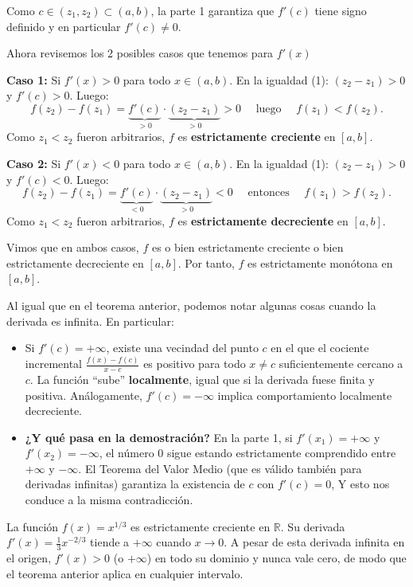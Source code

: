 \begin{prueba}
	Como $c \in (z_1, z_2) \subset (a, b)$, la parte 1 garantiza que $f'(c)$ tiene signo definido y en particular $f'(c) \neq 0$. 
	
	Ahora revisemos los 2 posibles casos que tenemos para  $f'(x)$
	
	\textbf{Caso 1:} Si $f'(x) > 0$ para todo $x \in (a, b)$.
	En la igualdad (1): $(z_2 - z_1) > 0$ y $f'(c) > 0$. Luego:
	\begin{equation*}
		f(z_2) - f(z_1) = \underbrace{f'(c)}_{>0} \cdot \underbrace{(z_2 - z_1)}_{>0} > 0 \quad \text{ luego } \quad f(z_1) < f(z_2).
	\end{equation*}
	Como $z_1 < z_2$ fueron arbitrarios, $f$ es \textbf{estrictamente creciente} en $[a, b]$.
	
	\textbf{Caso 2:} Si $f'(x) < 0$ para todo $x \in (a, b)$.
	En la igualdad (1): $(z_2 - z_1) > 0$ y $f'(c) < 0$. Luego:
	\begin{equation*}
		f(z_2) - f(z_1) = \underbrace{f'(c)}_{<0} \cdot \underbrace{(z_2 - z_1)}_{>0} < 0 \quad \text{ entonces }\quad f(z_1) > f(z_2).
	\end{equation*}
	Como $z_1 < z_2$ fueron arbitrarios, $f$ es \textbf{estrictamente decreciente} en $[a, b]$.
	
	Vimos que en ambos casos, $f$ es o bien estrictamente creciente o bien estrictamente decreciente en $[a, b]$. Por tanto, $f$ es estrictamente monótona en $[a, b]$.

\end{prueba}
\begin{remark}
    Al igual que en el teorema anterior, podemos notar algunas cosas cuando la derivada es infinita. En particular:

\begin{itemize}
	\item Si $f'(c) = +\infty$, existe una vecindad del punto $c$ en el que el cociente incremental $\frac{f(x) - f(c)}{x - c}$ es positivo para todo $x \neq c$ suficientemente cercano a $c$. La función “sube” \textbf{localmente}, igual que si la derivada fuese finita y positiva. Análogamente, $f'(c) = -\infty$ implica comportamiento localmente decreciente.
	
	\item \textbf{¿Y qué pasa en la demostración?} En la parte 1, si $f'(x_1) = +\infty$ y $f'(x_2) = -\infty$, el número 0 sigue estando estrictamente comprendido entre $+\infty$ y $-\infty$. El Teorema del Valor Medio (que es válido también para derivadas infinitas) garantiza la existencia de $c$ con $f'(c) = 0$, Y esto nos conduce a la misma contradicción.
\end{itemize}
\end{remark}
\begin{example}
    La función $f(x) = x^{1/3}$ es estrictamente creciente en $\mathbb{R}$. Su derivada $f'(x) = \frac{1}{3} x^{-2/3}$ tiende a $+\infty$ cuando $x \to 0$. A pesar de esta derivada infinita en el origen, $f'(x) > 0$ (o $+\infty$) en todo su dominio y nunca vale cero, de modo que el teorema anterior aplica en cualquier intervalo.
\end{example}

